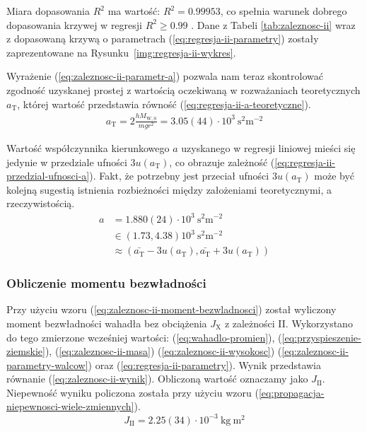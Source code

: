 \documentclass[twocolumn, a4paper, polish, 10pt]{article}
\newcommand{\JX}{\ensuremath{ J_{\mathrm{X}} }}
\newcommand{\JXn}[1]{\ensuremath{ J_{\mathrm{#1}} }}
\newcommand{\MWS}{\ensuremath{ M_{\mathrm{W,S}} }}
\begin{document}
Miara dopasowania $R^2$ ma wartość: $R^2 = 0.99953$, co spełnia warunek dobrego dopasowania krzywej w regresji $R^2 \geq 0.99$ \cite{epa-8000d}.
Dane z Tabeli \ref{tab:zaleznosc-ii} wraz z dopasowaną krzywą o parametrach (\ref{eq:regresja-ii-parametry}) zostały zaprezentowane na Rysunku~\ref{img:regresja-ii-wykres}.


Wyrażenie (\ref{eq:zaleznosc-ii-parametr-a}) pozwala nam teraz skontrolować zgodność uzyskanej prostej z wartością oczekiwaną w rozważaniach teoretycznych $a_{\mathrm{T}}$, której wartość przedstawia równość (\ref{eq:regresja-ii-a-teoretyczne}).
\begin{equation}
\begin{split}
    a_{\mathrm{T}} = 2 \frac{h \MWS}{m g r^2} = 3.05(44) \cdot 10^3~\mathrm{ s^2 m^{-2} }
    \label{eq:regresja-ii-a-teoretyczne}
\end{split}
\end{equation}

Wartość współczynnika kierunkowego $a$ uzyskanego w regresji liniowej mieści się jedynie w przedziale ufności $3u(a_{\mathrm{T}})$, co obrazuje zależność (\ref{eq:regresja-ii-przedzial-ufnosci-a}).
Fakt, że potrzebny jest przeciał ufności $3u(a_{\mathrm{T}})$ może być kolejną sugestią istnienia rozbieżności między założeniami teoretycznymi, a rzeczywistością.
\begin{equation}
\begin{split}
    a &= 1.880(24) \cdot 10^3~\mathrm{ s^2 m^{-2} } \\
    &\in \left( 1.73, 4.38 \right) 10^3~\mathrm{ s^2 m^{-2} } \\
    &\approx \left(
        \bar{a_{\mathrm{T}}} - 3 u(a_{\mathrm{T}}),
        \bar{a_{\mathrm{T}}} + 3 u(a_{\mathrm{T}})
    \right)
    \label{eq:regresja-ii-przedzial-ufnosci-a}
\end{split}
\end{equation}

\subsubsection{Obliczenie momentu bezwładności}
Przy użyciu wzoru (\ref{eq:zaleznosc-ii-moment-bezwladnosci}) został wyliczony moment bezwładności wahadła bez obciążenia $\JX$ z zależności II.
Wykorzystano do tego zmierzone wcześniej wartości: (\ref{eq:wahadlo-promien}), (\ref{eq:przyspieszenie-ziemskie}), (\ref{eq:zaleznosc-ii-masa}) (\ref{eq:zaleznosc-ii-wysokosc}) (\ref{eq:zaleznosc-ii-parametry-walcow}) oraz (\ref{eq:regresja-ii-parametry}). Wynik przedstawia równanie (\ref{eq:zaleznosc-ii-wynik}). Obliczoną wartość oznaczamy jako $\JXn{II}$.
Niepewność wyniku policzona została przy użyciu wzoru (\ref{eq:propagacja-niepewnosci-wiele-zmiennych}).
\begin{equation}
    \JXn{II} = 2.25(34) \cdot 10^{-3}~\mathrm{kg~m^2}
    \label{eq:zaleznosc-ii-wynik}
\end{equation}
\end{document}
